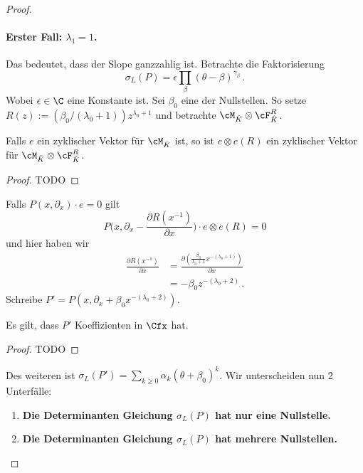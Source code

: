 \begin{proof}
\paragraph{Erster Fall: $\lambda_1=1$.} Das bedeutet, dass der Slope ganzzahlig
ist. Betrachte die Faktorisierung
\[
\sigma_L(P)=\epsilon\prod_{\beta}(\theta-\beta)^{\gamma_\beta}\,.
\]
Wobei $\epsilon\in\C$ eine Konstante ist.  Sei $\beta_0$  eine der Nullstellen.
So setze $R(z):=(\beta_0/(\lambda_0+1))z^{\lambda_0+1}$ und betrachte
$\cM_{\hat K}\otimes \cF_{\hat K}^R$.
\begin{lem}
Falls $e$ ein zyklischer Vektor für $\cM_{\hat K}$ ist, so ist $e\otimes e(R)$
ein zyklischer Vektor für $\cM_{\hat K}\otimes \cF_{\hat K}^R$.
\end{lem}
\begin{proof}
TODO
\end{proof}
\begin{comment}
AB HIER VLT NICHT RICHTIG, nur versuch
\end{comment}
Falls $P(x,\partial_x)\cdot e=0$ gilt
\[
P\Big(x,\partial_x-\frac{\partial R(x^{-1})}{\partial x}\Big)
  \cdot e\otimes e(R)=0
\]
und hier haben wir 
\begin{align*}
\frac{\partial R(x^{-1})}{\partial x} 
  &=\frac{\partial(\frac{\beta_0}{\lambda_0+1}x^{-(\lambda_0+1)})}{\partial
  x}\\
  &=-\beta_0z^{-(\lambda_0+2)} \,.
\end{align*}
Schreibe $P'=P(x,\partial_x+\beta_0x^{-(\lambda_0+2)})$.
\begin{lem}
Es gilt, dass $P'$ Koeffizienten in $\Cfx$ hat.
\end{lem}
\begin{proof}
TODO
\end{proof}
Des weiteren ist $\sigma_L(P')=\sum_{k\geq 0}\alpha_k(\theta+\beta_0)^k$. Wir
unterscheiden nun 2 Unterfälle:
\begin{enumerate}
\item \textbf{Die Determinanten Gleichung $\sigma_L(P)$ hat nur eine
Nullstelle.}
\begin{comment}TODO: Hier weiter \end{comment}
\item \textbf{Die Determinanten Gleichung $\sigma_L(P)$ hat mehrere
Nullstellen.}
\begin{comment}TODO: Hier weiter \end{comment}
\end{enumerate}


\end{proof}
